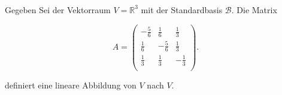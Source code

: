 

\newpage

\subsubsection{} %

Gegeben Sei der Vektorraum \( V = \mathbb{R}^3 \) mit der Standardbasis \( \mathcal{B} \). Die Matrix

\begin{equation*}
    A = \begin{pmatrix}
    -\frac{5}{6} & \frac{1}{6} & \frac{1}{3} \\
    \frac{1}{6}  & -\frac{5}{6} & \frac{1}{3} \\
    \frac{1}{3} & \frac{1}{3} & -\frac{1}{3} \\
    \end{pmatrix}.
\end{equation*}

definiert eine lineare Abbildung von \( V \) nach \( V \).

